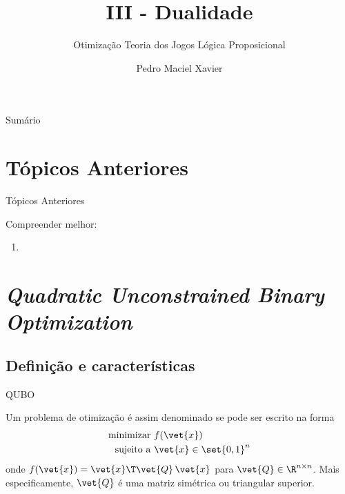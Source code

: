 \documentclass[brazil, MathSerif, aspectratio = 169]{beamer}
\author[Pedro]
{Pedro Maciel Xavier}
\title{III - Dualidade}
\subtitle{\small Otimização \textbullet{} Teoria dos Jogos \textbullet{} Lógica Proposicional}
\begin{document}
%
%
\begin{frame}%
    {Sumário}
    \tableofcontents
\end{frame}

\hidelogo

\section{Tópicos Anteriores}
\begin{frame}{Tópicos Anteriores}

    Compreender melhor:
    \begin{enumerate}%
        \item 
    \end{enumerate}
\end{frame}

\section{\emph{Quadratic Unconstrained Binary Optimization}}

\subsection{Definição e características}

\begin{frame}{QUBO}
    \begin{definition}
        Um problema de otimização é assim denominado se pode ser escrito na forma 
        \begin{align*}
            \text{minimizar } &f(\vet{x})\\
            \text{sujeito a } &\vet{x} \in \set{0, 1}^{n}
        \end{align*}
        onde $f(\vet{x}) = \vet{x}\T \vet{Q}\, \vet{x}$ para $\vet{Q} \in \R^{n \times n}$. Mais especificamente, $\vet{Q}$ é uma matriz simétrica ou triangular superior.
    \end{definition}    
\end{frame}
\end{document}
